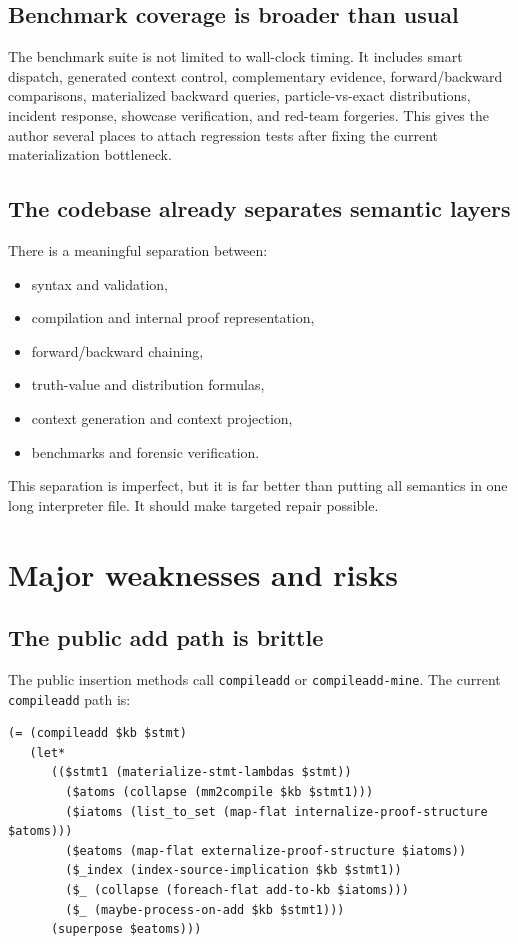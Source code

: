 \documentclass[11pt]{article}
\newcommand{\code}[1]{\texttt{#1}}
\begin{document}
\subsection{Benchmark coverage is broader than usual}

The benchmark suite is not limited to wall-clock timing.  It includes smart
dispatch, generated context control, complementary evidence, forward/backward
comparisons, materialized backward queries, particle-vs-exact distributions,
incident response, showcase verification, and red-team forgeries.  This gives
the author several places to attach regression tests after fixing the current
materialization bottleneck.

\subsection{The codebase already separates semantic layers}

There is a meaningful separation between:
\begin{itemize}
  \item syntax and validation,
  \item compilation and internal proof representation,
  \item forward/backward chaining,
  \item truth-value and distribution formulas,
  \item context generation and context projection,
  \item benchmarks and forensic verification.
\end{itemize}

This separation is imperfect, but it is far better than putting all semantics in
one long interpreter file.  It should make targeted repair possible.

\section{Major weaknesses and risks}

\subsection{The public add path is brittle}

The public insertion methods call \code{compileadd} or \code{compileadd-mine}.
The current \code{compileadd} path is:
\begin{verbatim}
(= (compileadd $kb $stmt)
   (let*
      (($stmt1 (materialize-stmt-lambdas $stmt))
        ($atoms (collapse (mm2compile $kb $stmt1)))
        ($iatoms (list_to_set (map-flat internalize-proof-structure $atoms)))
        ($eatoms (map-flat externalize-proof-structure $iatoms))
        ($_index (index-source-implication $kb $stmt1))
        ($_ (collapse (foreach-flat add-to-kb $iatoms)))
        ($_ (maybe-process-on-add $kb $stmt1)))
      (superpose $eatoms)))
\end{verbatim}
\end{document}

